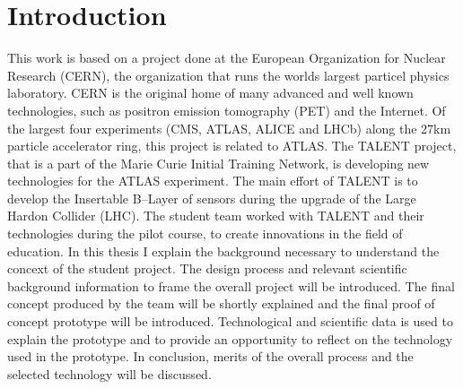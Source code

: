\documentclass[english,12pt,a4paper,dvips]{article}
\begin{document}
\section{Introduction}

\thispagestyle{empty}

This work is based on a project done at the European Organization for Nuclear Research (CERN), the organization that runs the worlds largest particel physics laboratory. CERN is the original home of many advanced and well known technologies, such as positron emission tomography (PET) and the Internet. Of the largest four experiments (CMS, ATLAS, ALICE and LHCb) along the 27km particle accelerator ring, this project is related to ATLAS.
The TALENT project, that is a part of the Marie Curie Initial Training Network, is developing new technologies for the ATLAS experiment. The main effort of TALENT is to develop the Insertable B--Layer of sensors during the upgrade of the Large Hardon Collider (LHC). The student team worked with TALENT and their technologies during the pilot course, to create innovations in the field of education.
In this thesis I explain the background necessary to understand the concext of the student project. The design process and relevant scientific background information to frame the overall project will be introduced. The final concept produced by the team will be shortly explained and the final proof of concept prototype will be introduced. Technological and scientific data is used to explain the prototype and to provide an opportunity to reflect on the technology used in the prototype. In conclusion, merits of the overall process and the selected technology will be discussed.


\clearpage

\end{document}
